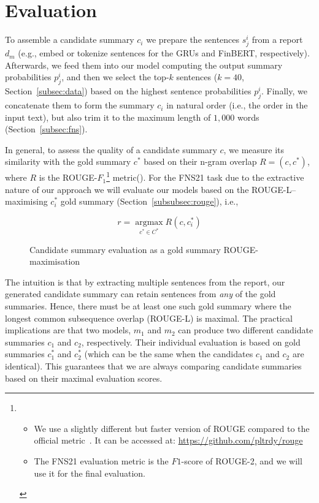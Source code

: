 \section{Evaluation}\label{sec:evaluation}

To assemble a candidate summary $c_{i}$ we prepare the sentences $s_{j}^{i}$ from a report $d_{m}$ (e.g., embed or tokenize sentences for the GRUs and FinBERT, respectively).
Afterwards, we feed them into our model computing the output summary probabilities $p_{j}^{i}$, and then we select the
top-$k$ sentences ($k=40$, Section~\ref{subsec:data}) based on the highest sentence probabilities $p_{j}^{i}$.
Finally, we concatenate them to form the summary $c_{i}$ in natural order (i.e., the order in the input text),
but also trim it to the maximum length of $1,000$ words (Section~\ref{subsec:fns}).

In general, to assess the quality of a candidate summary $c$, we measure its similarity with the gold summary $c^{*}$
based on their n-gram overlap $R=(c, c^{*})$, where $R$ is the ROUGE-$F_{1}$\footnote{
    \begin{itemize}
        \item We use a slightly different but faster version of ROUGE compared to the official metric~\cite{lin2004rouge}.
              It can be accessed at: \url{https://github.com/pltrdy/rouge}
        \item The FNS21 evaluation metric is the $F1$-score of ROUGE-2, and we will use it for the final evaluation.
    \end{itemize}
} metric(\cite{lin2004rouge}).
For the FNS21 task due to the extractive nature of our approach we will evaluate our models based on
the ROUGE-L--maximising $c^{*}_{i}$ gold summary (Section~\ref{subsubsec:rouge}), i.e.,

\begin{figure}[h]
    \centering
    \begin{equation}\label{eq:rouge_max}
        r = \underset{c^{*} \in C^{*}}{\operatorname{argmax}} R(c, c^{*}_{i})
    \end{equation}
    \caption{Candidate summary evaluation as a gold summary ROUGE-maximisation}
    \label{fig:rouge_max}
\end{figure}

The intuition is that by extracting multiple sentences from the report, our generated candidate summary can
retain sentences from \emph{any} of the gold summaries.
Hence, there must be at least one such gold summary where the longest common subsequence overlap (ROUGE-L) is maximal.
The practical implications are that two models, $m_{1}$ and $m_{2}$ can produce two different candidate summaries
$c_{1}$ and $c_{2}$, respectively.
Their individual evaluation is based on gold summaries $c^{*}_{1}$ and $c^{*}_{2}$ (which can be the same when the
candidates $c_{1}$ and $c_{2}$ are identical).
This guarantees that we are always comparing candidate summaries based on their maximal evaluation scores.

